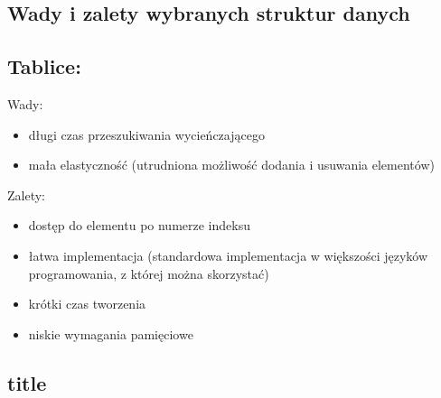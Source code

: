 \documentclass[polish,polish,a4paper]{article}
\begin{document}
\begin{spacing}{1.5}
\section{Wady i zalety wybranych struktur danych}
\subsection{Tablice:}
Wady:
\begin{itemize}
	\item długi czas przeszukiwania wycieńczającego
	\item mała elastyczność (utrudniona możliwość dodania i usuwania elementów)
\end{itemize}
Zalety:
\begin{itemize}
	\item dostęp do elementu po numerze indeksu
	\item łatwa implementacja (standardowa implementacja w większości języków programowania, z której można skorzystać)
	\item krótki czas tworzenia
	\item niskie wymagania pamięciowe
\end{itemize}

\subsection{title}


\end{spacing}
	\newpage
	\tableofcontents
\end{document}
